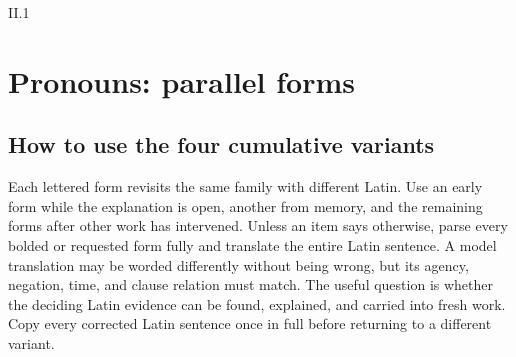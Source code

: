 \begin{courseunit}{II.1}
\chapter{Pronouns: parallel forms}

\ifsolutions\else
\section*{How to use the four cumulative variants}

Each lettered form revisits the same family with different Latin.  Use an early
form while the explanation is open, another from memory, and the remaining
forms after other work has intervened.  Unless an item says otherwise, parse
every bolded or requested form fully and translate the entire Latin sentence.
A model translation may be worded differently without being wrong, but its
agency, negation, time, and clause relation must match.  The useful question is
whether the deciding Latin evidence can be found, explained, and carried into
fresh work.  Copy every corrected Latin sentence once in full before returning
to a different variant.
\fi


\end{courseunit}
